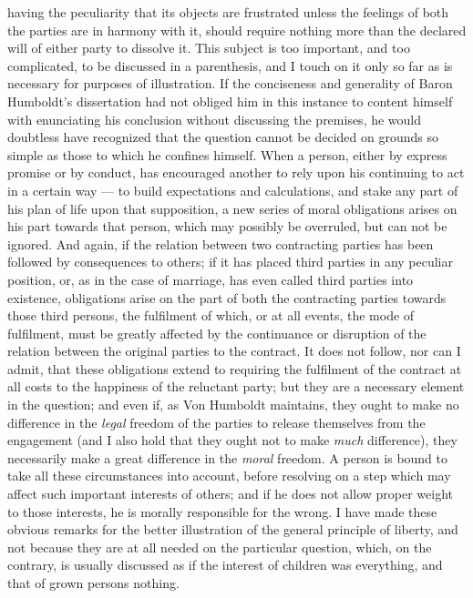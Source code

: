 \documentclass[12pt]{report}
\begin{document}
having the peculiarity that its objects are frustrated unless the feelings of both the parties are in harmony with it, should require nothing more than the declared will of either party to dissolve it. This subject is too important, and too complicated, to be discussed in a parenthesis, and I touch on it only so far as is necessary for purposes of illustration. If the conciseness and generality of Baron Humboldt's dissertation had not obliged him in this instance to content himself with enunciating his conclusion without discussing the premises, he would doubtless have recognized that the question cannot be decided on grounds so simple as those to which he confines himself. When a person, either by express promise or by conduct, has encouraged another to rely upon his continuing to act in a certain way — to build expectations and calculations, and stake any part of his plan of life upon that supposition, a new series of moral obligations arises on his part towards that person, which may possibly be overruled, but can not be ignored. And again, if the relation between two contracting parties has been followed by consequences to others; if it has placed third parties in any peculiar position, or, as in the case of marriage, has even called third parties into existence, obligations arise on the part of both the contracting parties towards those third persons, the fulfilment of which, or at all events, the mode of fulfilment, must be greatly affected by the continuance or disruption of the relation between the original parties to the contract. It does not follow, nor can I admit, that these obligations extend to requiring the fulfilment of the contract at all costs to the happiness of the reluctant party; but they are a necessary element in the question; and even if, as Von Humboldt maintains, they ought to make no difference in the \emph{legal} freedom of the parties to release themselves from the engagement (and I also hold that they ought not to make \emph{much} difference), they necessarily make a great difference in the \emph{moral} freedom. A person is bound to take all these circumstances into account, before resolving on a step which may affect such important interests of others; and if he does not allow proper weight to those interests, he is morally responsible for the wrong. I have made these obvious remarks for the better illustration of the general principle of liberty, and not because they are at all needed on the particular question, which, on the contrary, is usually discussed as if the interest of children was everything, and that of grown persons nothing.
\end{document}
